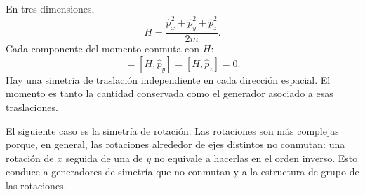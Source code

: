 En tres dimensiones,
\begin{equation}
H
=
\frac{\hat p_x^2+\hat p_y^2+\hat p_z^2}{2m}.
\end{equation}
Cada componente del momento conmuta con \(H\):
\begin{equation}
[H,\hat p_x]=[H,\hat p_y]=[H,\hat p_z]=0.
\end{equation}
Hay una simetría de traslación independiente en cada dirección espacial. El momento es tanto la cantidad conservada como el generador asociado a esas traslaciones.

El siguiente caso es la simetría de rotación. Las rotaciones son más complejas porque, en general, las rotaciones alrededor de ejes distintos no conmutan: una rotación de \(x\) seguida de una de \(y\) no equivale a hacerlas en el orden inverso. Esto conduce a generadores de simetría que no conmutan y a la estructura de grupo de las rotaciones.
